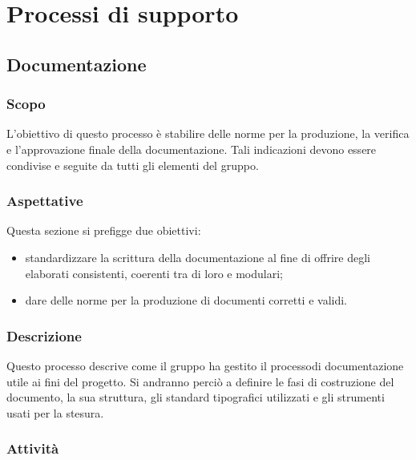 \section{Processi di supporto}
    \subsection{Documentazione}
        \subsubsection{Scopo}
            L'obiettivo di questo processo è stabilire delle norme per la produzione, la verifica e l'approvazione finale della documentazione. Tali indicazioni devono essere condivise e seguite da tutti gli elementi del gruppo.
        \subsubsection{Aspettative}
            Questa sezione si prefigge due obiettivi:
            \begin{itemize}
                \item standardizzare la scrittura della documentazione al fine di offrire degli elaborati consistenti, coerenti tra di loro e modulari;
                \item dare delle norme per la produzione di documenti corretti e validi.
            \end{itemize}
        \subsubsection{Descrizione}
        	Questo processo descrive come il gruppo ha gestito il processo\glosp di documentazione utile ai fini del progetto\glo.
        	Si andranno perciò a definire le fasi di costruzione del documento, la sua struttura, gli standard tipografici utilizzati e gli strumenti
        	usati per la stesura.
        \subsubsection{Attività}
